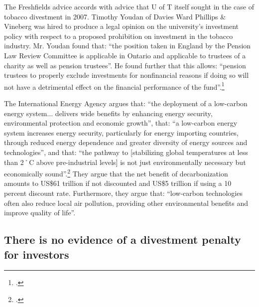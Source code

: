 \documentclass[10pt]{article}
\begin{document}
The Freshfields advice accords with advice that U of T itself sought in the case of tobacco divestment in 2007.
Timothy Youdan of Davies Ward Phillips \& Vineberg was hired to produce a legal opinion on the university's investment policy with respect to a proposed prohibition on investment in the tobacco 
industry.
Mr. Youdan found that: ``the position taken in England by the Pension Law Review Committee 
is applicable in Ontario and applicable to trustees of a charity as well as pension trustees''.
He found further that this allows: ``pension trustees to properly exclude investments for nonfinancial reasons if doing so will not have a detrimental effect on the financial performance of the fund''.\footcite[][p. 6]{TobaccoReport_2007}



The International Energy Agency argues that: ``the deployment of a low-carbon energy system... delivers wide benefits by enhancing energy security, environmental protection and economic growth'', that: ``a low-carbon energy system increases energy security, particularly for energy importing countries, through reduced energy dependence and greater diversity of energy sources and technologies'', and that: ``the pathway to [stabilizing global temperatures at less than 2˚C above pre-industrial levels] is not just environmentally necessary but economically sound''.\footcite[][]{IEAOnTwoDegrees}
They argue that the net benefit of decarbonization amounts to US\$61 trillion if not discounted and US\$5 trillion if using a 10 percent discount rate.
Furthermore, they argue that: ``low-carbon technologies often also reduce local air pollution, providing other environmental benefits and improve quality of life''.



\subsection {There is no evidence of a divestment penalty for investors}
\label{NoDivestPenalty}
\end{document}
